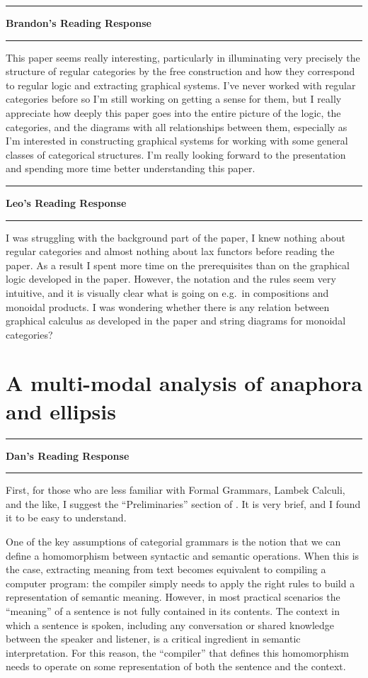 \documentclass{amsart}
\newcommand{\iam}[1]{
  \vspace{0.25em}
  \hrule
  \vspace{0.25em}
  \textbf{{#1}'s Reading Response}
  \vspace{0.25em}
  \hrule
  \vspace{1em}
}
\begin{document}
\iam{Brandon}

This paper seems really interesting, particularly in illuminating very precisely the structure of regular categories by the free construction and how they correspond to regular logic and extracting graphical systems.  I've never worked with regular categories before so I'm still working on getting a sense for them, but I really appreciate how deeply this paper goes into the entire picture of the logic, the categories, and the diagrams with all relationships between them, especially as I'm interested in constructing graphical systems for working with some general classes of categorical structures.  I'm really looking forward to the presentation and spending more time better understanding this paper.

\iam{Leo}

I was struggling with the background part of the paper, I knew nothing about regular categories and almost nothing about lax functors before reading the paper. As a result I spent more time on the prerequisites than on the graphical logic developed in the paper. However, the notation and the rules seem very intuitive, and it is visually clear what is going on e.g.~in compositions and monoidal products. I was wondering whether there is any relation between graphical calculus as developed in the paper and string diagrams for monoidal categories?


\section{A multi-modal analysis of anaphora and ellipsis}
\label{sec:anaphora}

\iam{Dan}

First, for those who are less familiar with Formal Grammars, Lambek Calculi, and the like, I suggest the ``Preliminaries'' section of \cite{PentusGrammars}. It is very brief, and I found it to be easy to understand.

One of the key assumptions of categorial grammars is the notion that we can define a homomorphism between syntactic and semantic operations. When this is the case, extracting meaning from text becomes equivalent to compiling a computer program: the compiler simply needs to apply the right rules to build a representation of semantic meaning. However, in most practical scenarios the ``meaning'' of a sentence is not fully contained in its contents. The context in which a sentence is spoken, including any conversation or shared knowledge between the speaker and listener, is a critical ingredient in semantic interpretation. For this reason, the ``compiler'' that defines this homomorphism needs to operate on some representation of both the sentence and the context.
\end{document}

